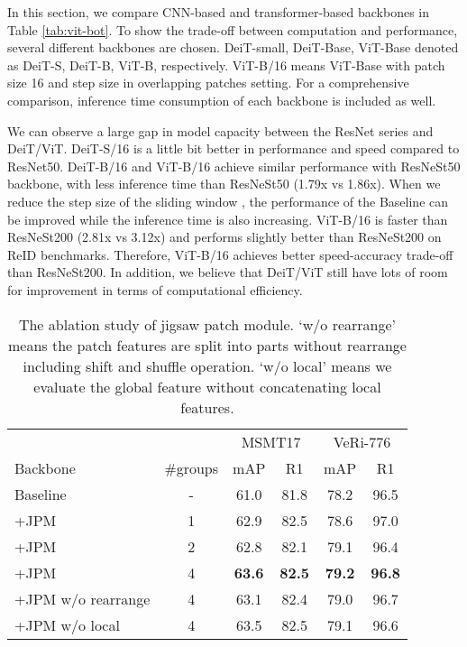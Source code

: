\documentclass[10pt,twocolumn,letterpaper]{article}
\begin{document}
In this section, we compare CNN-based and transformer-based backbones in Table \ref{tab:vit-bot}. To show the trade-off between computation and performance, several different backbones are chosen. DeiT-small, DeiT-Base, ViT-Base denoted as DeiT-S, DeiT-B, ViT-B, respectively. ViT-B/16 means ViT-Base with patch size 16 and step size  in overlapping patches setting.
For a comprehensive comparison, inference time consumption of each backbone is included as well. 

We can observe a large gap in model capacity between the ResNet series and DeiT/ViT. DeiT-S/16 is a little bit better in performance and speed compared to ResNet50. DeiT-B/16 and ViT-B/16 achieve similar performance with ResNeSt50 \cite{zhang2020resnest} backbone, with less inference time than ResNeSt50 (1.79x vs 1.86x).  When we reduce the step size of the sliding window , the performance of the Baseline can be improved while the inference time is also increasing. ViT-B/16 is faster than ResNeSt200 (2.81x vs 3.12x) and performs slightly better than ResNeSt200 on ReID benchmarks. Therefore, ViT-B/16 achieves better speed-accuracy trade-off than ResNeSt200. In addition, we believe that DeiT/ViT still have lots of room for improvement in terms of computational efficiency.


\renewcommand{\multirowsetup}{\centering}
\begin{table}[tb]
\footnotesize
    \begin{center}
    \begin{tabular}{ lc|cc|cc}
    \hline
    &  & \multicolumn{2}{c|}{MSMT17} & \multicolumn{2}{c}{VeRi-776} \\
    Backbone &\#groups    & mAP    & R1  & mAP & R1  \\
    \hline
    \hline
    Baseline   & -       & 61.0  & 81.8  & 78.2  & 96.5 \\
    +JPM        & 1     &62.9   & 82.5  & 78.6  & 97.0 \\
    +JPM        & 2     &62.8   & 82.1  & 79.1  & 96.4\\
    +JPM        & 4     &\textbf{63.6}   & \textbf{82.5}  & \textbf{79.2}  & \textbf{96.8} \\
+JPM w/o rearrange & 4& 63.1  & 82.4  &  79.0  & 96.7 \\
    +JPM w/o local  & 4  & 63.5 & 82.5     & 79.1 & 96.6 \\
    \hline
    \end{tabular}
    \end{center}
    \vspace{-1.em}
    \caption{\label{tab:jpm} The ablation study of jigsaw patch module. `w/o rearrange' means the patch features are split into parts without rearrange including shift and shuffle operation. `w/o local' means we evaluate the global feature without concatenating local features.}
    \vspace{-1.5em}
\end{table}
\end{document}
